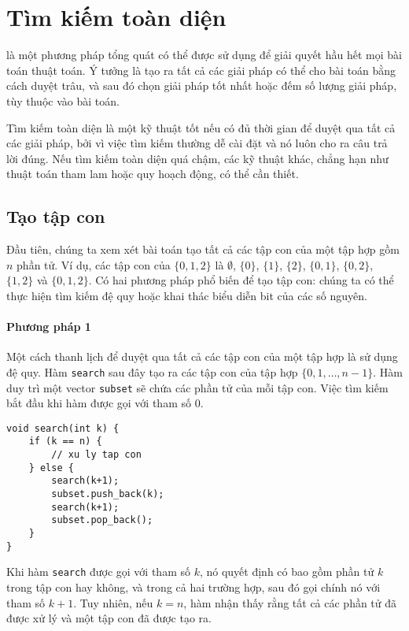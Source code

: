 \chapter{Tìm kiếm toàn diện}

là một phương pháp tổng quát có thể được sử dụng
để giải quyết hầu hết mọi bài toán thuật toán.
Ý tưởng là tạo ra tất cả các giải pháp
có thể cho bài toán bằng cách duyệt trâu,
và sau đó chọn giải pháp tốt nhất hoặc đếm
số lượng giải pháp, tùy thuộc vào bài toán.

Tìm kiếm toàn diện là một kỹ thuật tốt
nếu có đủ thời gian để duyệt qua tất cả các giải pháp,
bởi vì việc tìm kiếm thường dễ cài đặt
và nó luôn cho ra câu trả lời đúng.
Nếu tìm kiếm toàn diện quá chậm,
các kỹ thuật khác, chẳng hạn như thuật toán tham lam hoặc
quy hoạch động, có thể cần thiết.

\section{Tạo tập con}


Đầu tiên, chúng ta xem xét bài toán tạo
tất cả các tập con của một tập hợp gồm $n$ phần tử.
Ví dụ, các tập con của $\{0,1,2\}$ là
$\emptyset$, $\{0\}$, $\{1\}$, $\{2\}$, $\{0,1\}$,
$\{0,2\}$, $\{1,2\}$ và $\{0,1,2\}$.
Có hai phương pháp phổ biến để tạo tập con:
chúng ta có thể thực hiện tìm kiếm đệ quy
hoặc khai thác biểu diễn bit của các số nguyên.

\subsubsection{Phương pháp 1}

Một cách thanh lịch để duyệt qua tất cả các tập con
của một tập hợp là sử dụng đệ quy.
Hàm \texttt{search} sau đây
tạo ra các tập con của tập hợp
$\{0,1,\ldots,n-1\}$.
Hàm duy trì một vector \texttt{subset}
sẽ chứa các phần tử của mỗi tập con.
Việc tìm kiếm bắt đầu khi hàm được gọi
với tham số 0.

\begin{lstlisting}
void search(int k) {
    if (k == n) {
        // xu ly tap con
    } else {
        search(k+1);
        subset.push_back(k);
        search(k+1);
        subset.pop_back();
    }
}
\end{lstlisting}

Khi hàm \texttt{search}
được gọi với tham số $k$,
nó quyết định có bao gồm
phần tử $k$ trong tập con hay không,
và trong cả hai trường hợp,
sau đó gọi chính nó với tham số $k+1$.
Tuy nhiên, nếu $k=n$, hàm nhận thấy rằng
tất cả các phần tử đã được xử lý
và một tập con đã được tạo ra.

